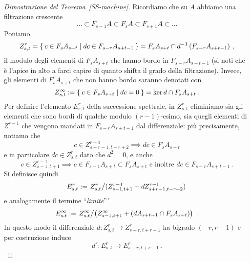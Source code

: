 \begin{proof}[Dimostrazione del Teorema~\ref{SS-machine}]
	Ricordiamo che su $A$ abbiamo una filtrazione crescente
	\begin{equation*}
		\dots \subset F_{s-1}A \subset F_{s}A \subset F_{s+1}A \subset \dots
	\end{equation*}
		Poniamo
		\begin{equation*}
			Z_{s,t}^{r} = \Set{c \in F_{s}A_{s+t} | dc \in F_{s-r}A_{s+t-1}}
			= F_{s}A_{s+t} \cap d^{-1}\left(F_{s-r}A_{s+t-1}\right) \,,
		\end{equation*}
		il modulo degli elementi di $F_{s}A_{s+t}$ che hanno bordo
		in $F_{s-r}A_{s+t-1}$ (si noti che è l'apice in alto a
		farci capire di quanto shifta il grado della filtrazione).
		Invece, gli elementi di $F_{s}A_{s+t}$
		che non hanno bordo saranno denotati con
		\begin{equation*}
			Z_{s,t}^{\infty} := \Set{c \in F_{s}A_{s+t} | dc = 0} = \ker d \cap F_{s}A_{s+t}\,.
		\end{equation*}
		Per definire l'elemento $E^{r}_{s,t}$ della successione spettrale,
		in $Z_{s,t}^{r}$ eliminiamo sia gli elementi che sono bordi di
		qualche modulo $(r-1)$-esimo, sia quegli elementi di $Z^{r-1}$ che 
		vengono mandati in $F_{s-r}A_{s+t-1}$ dal differenziale: più precisamente,
		notiamo che 
		\begin{equation*}
			c \in Z^{r-1}_{s+r-1,t-r+2} \implies dc \in F_{s}A_{s+t}
		\end{equation*}
		e in particolare $dc \in Z_{s,t}^{r}$ dato che $d^{2}=0$,
		e anche
		\begin{equation*}
			c \in Z^{r-1}_{s-1,t+1} \implies
			c \in F_{s-1}A_{s+t} \subset F_{s}A_{s+t}
			\text{ e inoltre } dc \in F_{s-r}A_{s+t-1}\,.
		\end{equation*}
		Si definisce quindi
		\begin{equation*}
			E^{r}_{s,t} := \left. Z_{s,t}^{r} \middle/ 
			(Z_{s-1, t+1}^{r-1} + dZ^{r-1}_{s+r-1, t-r+2}) \right.
		\end{equation*}
		e analogamente il termine ``\emph{limite}'''
			\begin{equation*}
				E^{\infty}_{s,t} := \left. Z^{\infty}_{s,t} \middle/ 
				\big( Z_{s-1,t+1}^{\infty} + (dA_{s+t+1} \cap F_{s}A_{s+t}) \big) \right. \,.
			\end{equation*}
		In questo modo il differenziale
			$d: Z^{r}_{s,t} \to Z_{s-r, t+r-1}^{r}$
		ha bigrado $(-r,r-1)$ e per costruzione induce
		\begin{equation*}
		 	d^{r} : E^{r}_{s,t} \longrightarrow E^{r}_{s-r,t+r-1} \,.
		 \end{equation*} 

\end{proof}
